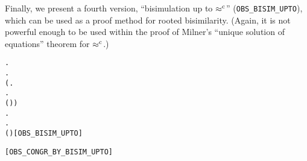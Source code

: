 Finally, we  present a fourth version, ``bisimulation up
to $\mathrel{\approx^{\rm{c}}}$'' (\texttt{OBS_BISIM_UPTO}), which can be used as a proof method for rooted
bisimilarity. (Again, it is not powerful enough to be used within
the proof of Milner's ``unique solution of equations''
theorem for $\mathrel{\approx^{\rm{c}}}$.)
\begin{alltt}
  \HOLSymConst{\HOLTokenDefEquality{}}
  \HOLSymConst{\HOLTokenForall{}} .
         \HOLSymConst{\HOLTokenImp{}}
      \HOLSymConst{\HOLTokenForall{}}.
          (\HOLSymConst{\HOLTokenForall{}}.
                \HOLTokenTransBegin{}\HOLTokenTransEnd {} \HOLSymConst{\HOLTokenImp{}}
               \HOLSymConst{\HOLTokenExists{}}.
                    \HOLTokenWeakTransBegin{}\HOLTokenImp{}  \HOLSymConst{\HOLTokenConj{}}
                   ( \HOLSymConst{\HOLTokenRCompose{}}  \HOLSymConst{\HOLTokenRCompose{}} )  ) \HOLSymConst{\HOLTokenConj{}}
          \HOLSymConst{\HOLTokenForall{}}.
               \HOLTokenTransBegin{}\HOLTokenTransEnd {} \HOLSymConst{\HOLTokenImp{}}
              \HOLSymConst{\HOLTokenExists{}}.
                   \HOLTokenWeakTransBegin{}\HOLTokenImp{}  \HOLSymConst{\HOLTokenConj{}}
                  ( \HOLSymConst{\HOLTokenRCompose{}}  \HOLSymConst{\HOLTokenRCompose{}} )  \hfill{[OBS_BISIM_UPTO]}

\HOLTokenTurnstile{}   \HOLSymConst{\HOLTokenConj{}}    \HOLSymConst{\HOLTokenImp{}}  \HOLSymConst{\HOLTokenObsCongr} \hfill{[OBS_CONGR_BY_BISIM_UPTO]}
\end{alltt}

